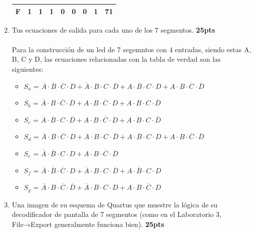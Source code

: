 \documentclass{templateNote}
\begin{document}
\begin{enumerate}
\begin{table}[H]
\begin{tabular}{|c|c|c|c|c|c|c|c|c|}
            F            & 1              & 1              & 1              & 0              & 0              & 0              & 1              & 71         \\ \hline
        \end{tabular}
    \end{table}
    \item Tus ecuaciones de salida para cada uno de los 7 segmentos. \textbf{25pts} \\\\
    Para la construcción de un led de 7 segemntos con 4 entradas, siendo estas A, B, C y D, las ecuaciones relacionadas con la tabla de verdad son las siguientes:
    \begin{itemize}
        \item $S_a$ = $\overline{A} \cdot \overline{B} \cdot \overline{C} \cdot D + \overline{A} \cdot B \cdot C \cdot \overline{D} + A \cdot \overline{B} \cdot C \cdot D + A \cdot B \cdot \overline{C} \cdot \overline{D}$ \\
        \item $S_b$ = $\overline{A} \cdot B \cdot \overline{C} \cdot \overline{D} + A \cdot B \cdot \overline{C} \cdot D + A \cdot B \cdot C \cdot \overline{D}$ \\
        \item $S_c$ = $\overline{A} \cdot \overline{B} \cdot C \cdot \overline{D} + A \cdot B \cdot \overline{C} \cdot D + A \cdot B \cdot C \cdot \overline{D}$ \\
        \item $S_d$ = $\overline{A} \cdot B \cdot \overline{C} \cdot D + \overline{A} \cdot B \cdot C \cdot \overline{D} + A \cdot \overline{B} \cdot C \cdot D + A \cdot B \cdot \overline{C} \cdot \overline{D}$ \\
        \item $S_e$ = $\overline{A} \cdot \overline{B} \cdot C \cdot D + A \cdot B \cdot \overline{C} \cdot \overline{D}$ \\
        \item $S_f$ = $\overline{A} \cdot \overline{B} \cdot \overline{C} \cdot D + \overline{A} \cdot B \cdot C \cdot \overline{D} + A \cdot \overline{B} \cdot C \cdot D$ \\
        \item $S_g$ = $\overline{A} \cdot B \cdot \overline{C} \cdot \overline{D} + \overline{A} \cdot B \cdot C \cdot D + A \cdot B \cdot \overline{C} \cdot D$
    \end{itemize}
    \newpage
    \item Una imagen de su esquema de Quartus que muestre la lógica de su decodificador de pantalla de 7 segmentos (como en el Laboratorio 3, File→Export generalmente funciona bien). \textbf{25pts}

\end{enumerate}
\end{document}
